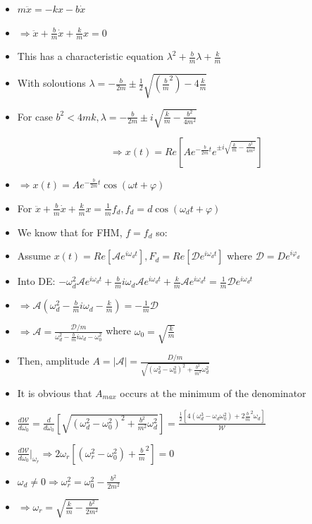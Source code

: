 \documentclass{article}
\begin{document}
\begin{itemize}
    \item \(m\ddot x = -kx - b\dot x\)
    \item \(\Rightarrow \ddot x + \frac{b}{m}\dot x + \frac{k}{m} x = 0\)
    \item This has a characteristic equation \(\lambda^2 + \frac{b}{m}\lambda + \frac{k}{m}\)
    \item With soloutions \(\lambda = - \frac{b}{2m} \pm \frac{1}{2}\sqrt{(\frac{b}{m}^2)-4\frac{k}{m}}\)
    \item For case \(b^2 < 4mk, \lambda = -\frac{b}{2m} \pm i\sqrt{\frac{k}{m} - \frac{b^2}{4m^2}}\)

    \[\Rightarrow x(t) = Re[Ae^{-\frac{b}{2m}t}e^{\pm i\sqrt{\frac{k}{m}-\frac{b^2}{4m^2}}}]\]
    \item \(\Rightarrow\boxed{ x(t) = Ae^{-\frac{b}{2m}t}\cos(\omega t + \varphi)}\)
\end{itemize}


\begin{itemize}
    \item For \(\ddot x + \frac{b}{m}\dot x + \frac{k}{m}x = \frac{1}{m}f_d, f_d = d\cos(\omega_d t+\varphi)\)
    \item We know that for FHM, \(f=f_d\) so:
    \item Assume \({x(t)=Re[\mathcal{A}e^{i\omega_d t}], F_d=Re[\mathcal{D}e^{i\omega_d t}]}\) where \(\mathcal{D} = De^{i\varphi_d}\)
    \item Into DE: \(-\omega_d^2\mathcal{A}e^{i\omega_d t} + \frac{b}{m}i\omega_d\mathcal{A}e^{i\omega_d t}+\frac{k}{m}\mathcal{A}e^{i\omega_d t}=\frac{1}{m}\mathcal{D}e^{i\omega_d t}\)
    \item \(\Rightarrow \mathcal{A}(\omega_d^2-\frac{b}{m}i\omega_d-\frac{k}{m})=-\frac{1}{m}\mathcal{D}\)
    \item \(\Rightarrow \mathcal{A}=\frac{\mathcal{D}/m}{\omega_d^2-\frac{b}{m}i\omega_d-\omega_0^2}\) where \(\omega_0=\sqrt{\frac{k}{m}}\)
    \item Then, amplitude \(A=|\mathcal{A}|=\frac{D/m}{\sqrt{(\omega_d^2-\omega_0^2)^2+\frac{b^2}{m^2}\omega_d^2}}\)
    \item It is obvious that \(A_{max}\) occurs at the minimum of the denominator
    \item \(\frac{d\mathcal{W}}{d\omega_0}=\frac{d}{d\omega_0}[\sqrt{(\omega_d^2-\omega_0^2)^2+\frac{b^2}{m^2}\omega_d^2}]=\frac{\frac{1}{2}[4(\omega_d^3-\omega_d\omega_0^2)+2\frac{b}{m}^2\omega_d]}{\mathcal{W}}\)
    \item \(\frac{d\mathcal{W}}{d\omega_0}\rvert_{\omega_r}\Rightarrow 2\omega_r[(\omega_r^2-\omega_0^2)+\frac{b}{m}^2]=0\)
    \item \(\omega_d \not=0\Rightarrow\omega_r^2=\omega_0^2-\frac{b^2}{2m^2}\)
    \item \(\Rightarrow\boxed{\omega_r=\sqrt{\frac{k}{m}-\frac{b^2}{2m^2}}}\)
\end{itemize}
\end{document}
